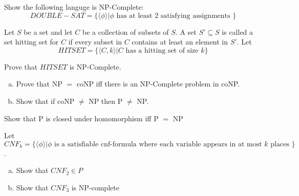 \documentclass[12pt]{exam}
\begin{document}
\begin{questions}
  Show the following languge is NP-Complete:
  \[DOUBLE-SAT=\{\langle \phi \rangle | \phi \text{ has at least 2 satisfying assignments }\}\]


  \question{} %

  Let $S$ be a set and let $C$ be a collection of subsets of $S$. A set $S'\subseteq S$ is called a set hitting set for $C$ if every subset in $C$ contains at least an element in $S'$. Let
  \[HITSET = \{\langle C,k \rangle | C \text{ has a hitting set of size } k\}\]

  Prove that $HITSET$ is NP-Complete.


  \question{} %

  \begin{enumerate}[a.]
    \item Prove that NP $=$ coNP iff there is an NP-Complete problem in coNP.
    \item Show that if coNP $\neq$ NP then P $\neq$ NP.

  \end{enumerate}


  \question{} %

  Show that P is closed under homomorphism iff P $=$ NP

  \question{} %

  Let $CNF_{k} = \{\langle \phi \rangle | \phi \text{ is a satisfiable cnf-formula where each variable appears in at most } k \text{ places }\}$.

  \begin{enumerate}[a.]
    \item Show that $CNF_{2} \in P$
    \item Show that $CNF_{3}$ is NP-complete
  \end{enumerate}


\end{questions}
\end{document}
